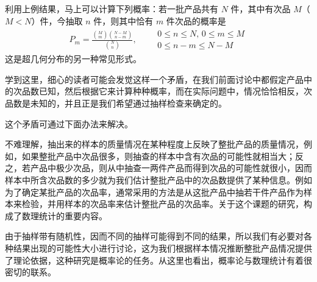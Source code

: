 \documentclass[../../main.tex]{subfiles}
\begin{document}
\begin{example}[二项分布与超几何分布]
利用上例结果，马上可以计算下列概率：若一批产品共有 $N$ 件，其中有次品 $M$（$M<N$）件，今抽取 $n$ 件，则其中恰有 $m$ 件次品的概率是
\begin{align}
P_m=\frac{\binom{M}{m}\binom{N-M}{n-m}}{\binom{N}{n}},\qquad
\begin{array}{l}
0\leqslant n\leqslant N,\,0\leqslant m\leqslant M\\
0\leqslant n-m\leqslant N-M
\end{array}\label{align:ch01-超几何分布常见形式}
\end{align}
这是超几何分布的另一种常见形式。

学到这里，细心的读者可能会发觉这样一个矛盾，在我们前面讨论中都假定产品中的次品数已知，然后根据它来计算种种概率，而在实际问题中，情况恰恰相反，次品数是未知的，并且正是我们希望通过抽样检查来确定的。

这个矛盾可通过下面办法来解决。

不难理解，抽出来的样本的质量情况在某种程度上反映了整批产品的质量情况，例如，如果整批产品中次品很多，则抽查的样本中含有次品的可能性就相当大；反之，若产品中极少次品，则从中抽查一两件产品而得到次品的可能性就很小，因而样本中所含次品数的多少就为我们估计整批产品中的次品数提供了某种信息。例如为了确定某批产品的次品率，通常采用的方法是从这批产品中抽若干件产品作为样本来检验，并用样本的次品率来估计整批产品的次品率。关于这个课题的研究，构成了数理统计的重要内容。

由于抽样带有随机性，因而不同的抽样可能得到不同的结果，所以我们有必要对各种结果出现的可能性大小进行讨论，这为我们根据样本情况推断整批产品情况提供了理论依据，这种研究是概率论的任务。从这里也看出，概率论与数理统计有着很密切的联系。

\end{example}
\end{document}
